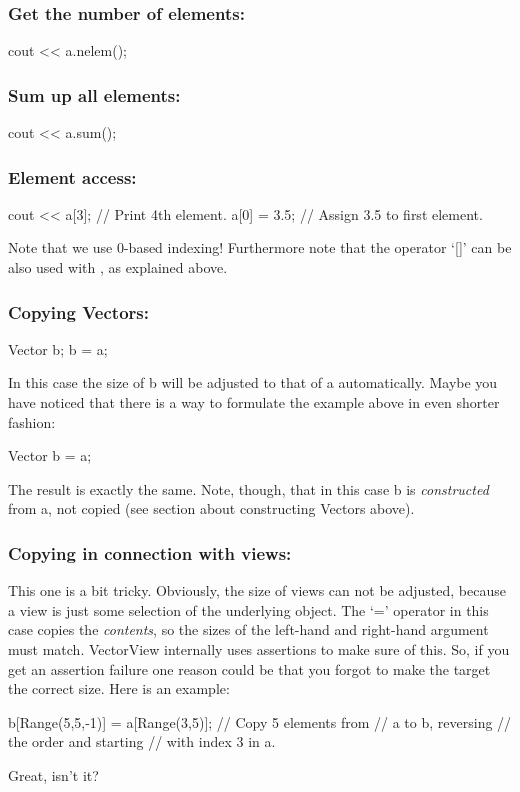 \subsubsection{Get the number of elements:}
\begin{code}
cout << a.nelem();
\end{code}

\subsubsection{Sum up all elements:}
\begin{code}
cout << a.sum();
\end{code}

\subsubsection{Element access:}
\begin{code}
cout << a[3];   // Print 4th element.
a[0] = 3.5;     // Assign 3.5 to first element.
\end{code}

Note that we use 0-based indexing! Furthermore note that the operator
`[]' can be also used with , as explained above.

\subsubsection{Copying Vectors:}
\begin{code}
Vector b;
b = a;
\end{code}
In this case the size of b will be adjusted to that of a
automatically. Maybe you have noticed that there is a way to formulate the 
example above in even shorter fashion:
\begin{code}
Vector b = a;
\end{code}
The result is exactly the same. Note, though, that in this case b is
\emph{constructed} from a, not copied (see section about constructing
Vectors above). 

\subsubsection{Copying in connection with views:}
This one is a bit tricky. Obviously, the size of views can not be
adjusted, because a view is just some selection of the underlying
object. The `=' operator in this case copies the
\emph{contents}, so the sizes of the left-hand and right-hand argument
must match. VectorView internally uses assertions to make sure of
this. So, if you get an assertion failure one reason could be that you
forgot to make the target the correct size. Here is an example:
\begin{code}
b[Range(5,5,-1)] = a[Range(3,5)];  // Copy 5 elements from 
                                   // a to b, reversing 
                                   // the order and starting
                                   // with index 3 in a.
\end{code}
Great, isn't it?

